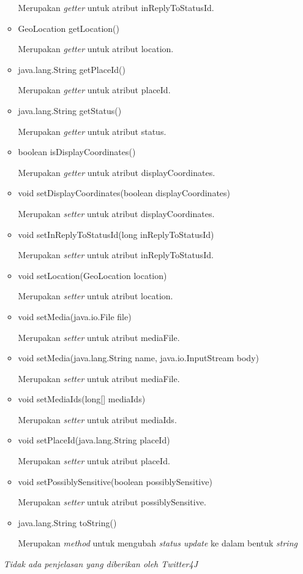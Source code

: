 \begin{itemize}
\begin{itemize}
			Merupakan \textit{getter} untuk atribut inReplyToStatusId.
			\item GeoLocation getLocation() 
			
			Merupakan \textit{getter} untuk atribut location.
			\item java.lang.String getPlaceId() 
			
			Merupakan \textit{getter} untuk atribut placeId.
			\item java.lang.String getStatus() 
			
			Merupakan \textit{getter} untuk atribut status.
			\item boolean isDisplayCoordinates() 
			
			Merupakan \textit{getter} untuk atribut displayCoordinates.
			\item void setDisplayCoordinates(boolean displayCoordinates)
			
			Merupakan \textit{setter} untuk atribut displayCoordinates.
			\item void setInReplyToStatusId(long inReplyToStatusId) 
			
			Merupakan \textit{setter} untuk atribut inReplyToStatusId.
			\item void setLocation(GeoLocation location) 
			
			Merupakan \textit{setter} untuk atribut location.
			\item void setMedia(java.io.File file) 
			
			Merupakan \textit{setter} untuk atribut mediaFile.
			\item void setMedia(java.lang.String name, java.io.InputStream body) 
			
			Merupakan \textit{setter} untuk atribut mediaFile.
			\item void setMediaIds(long[] mediaIds) 
			
			Merupakan \textit{setter} untuk atribut mediaIds.
			\item void setPlaceId(java.lang.String placeId) 
			
			Merupakan \textit{setter} untuk atribut placeId.
			\item void setPossiblySensitive(boolean possiblySensitive) 
			
			Merupakan \textit{setter} untuk atribut possiblySensitive.
			\item java.lang.String 	toString() 
			
			Merupakan \textit{method} untuk mengubah \textit{status update} ke dalam bentuk \textit{string}
		\end{itemize}
	\textit{Tidak ada penjelasan yang diberikan oleh Twitter4J}
	\end{itemize}
	
